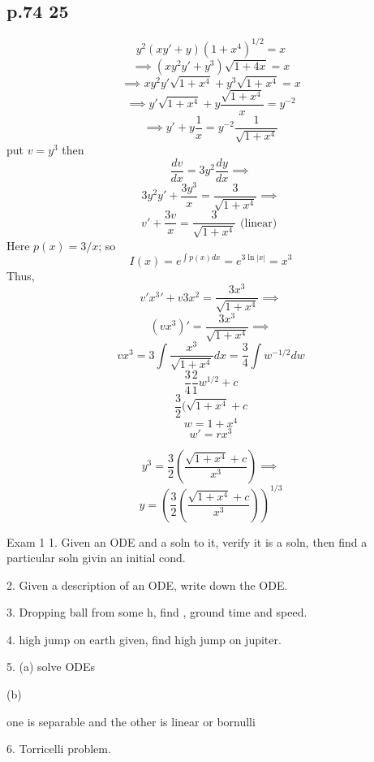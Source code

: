 \documentclass[10pt,a4paper]{article}
\begin{document}
  \subsection{p.74 25}
  \[ y^2(xy'+y)(1+x^4)^{1/2} = x \]
  \[ \implies (xy^2y' + y^3) \sqrt{1+4x} = x\]
  \[ \implies xy^2y' \sqrt{1+x^4} + y^3 \sqrt{1+x^4} = x \]
  \[ \implies y' \sqrt{1+x^4} + y \frac{ \sqrt{1+x^4}}{x} = y^{-2} \]
  \[ \implies y' +y \frac{1}{x} = y^{-2} \frac{1}{ \sqrt{1+x^4}} \]
  put \( v = y^3 \) then 
  \[ \frac{dv}{dx} = 3y^2 \frac{dy}{dx} \implies \]
  \[ 3y^2y' + \frac{3y^3}{x} = \frac{3}{ \sqrt{1+x^4}} \implies \]
  \[ v' + \frac{3v}{x} = \frac{3}{ \sqrt{1+x^4}} \text{ (linear) } \]
  Here \( p(x) = 3/x \); so\nonumber\\
  \[ I(x) = e^{\int p(x)dx} = e^{3\ln |x|} = x^3 \]
  Thus, 
  \[ v'x^3 ' + v3x^2 = \frac{3x^3}{ \sqrt{1+ x^4}} \implies \]
  \[ (vx^3)' = \frac{3x^3}{ \sqrt{1+x^4}} \implies \]
  \[ vx^3 = 3 \int \frac{x^3}{ \sqrt{1 + x^4}}dx = 
  \frac{3}{4} \int w^{-1/2} dw\]
  \[ \frac{3}{4} \frac{2}{1}w^{1/2} + c\]
  \[ \frac{3}{2} ( \sqrt{1+x^4} + c \]
  \[ w = 1+x^4  \]
  \[ w' = rx^3 \]

 \[ y^3 = \frac{3}{2} ( \frac{ \sqrt{1+x^4} + c}{x^3}) \implies  \]
 \[ y =  (\frac{3}{2} ( \frac{ \sqrt{1+x^4} + c}{x^3}))^{1/3}\] 


 Exam 1 
 1. Given an ODE and a soln to it, verify it is a soln, then find a
 particular soln givin an initial cond.

 2. Given a description of an ODE, write down the ODE. 

 3. Dropping ball from some h, find , ground time and speed.

 4. high jump on earth given, find high jump on jupiter. 

 5. (a) solve ODEs 
 
(b) 

one is separable and the other is linear or bornulli

6. Torricelli problem. 
\end{document}
